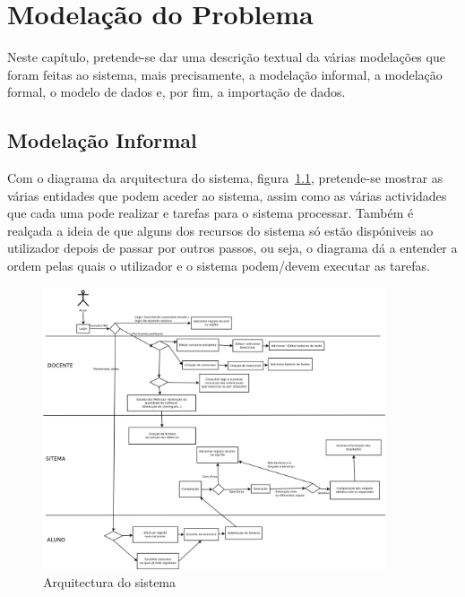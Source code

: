 \newcommand{\rarrow}{\rightarrow}
\newcommand{\larrow}{\leftarrow}
\newcommand{\unif}{\sim}
\def\prop#1#2#3{\noindent\\$\begin{array}{l} \{#1\} \\ #2 \\ \{#3\} \\ \end{array}$\\\\}

\chapter{Modelação do Problema} \label{chap modprob}
\minitoc

Neste capítulo, pretende-se dar uma descrição textual da várias modelações que foram feitas ao sistema, mais precisamente, a modelação informal, a modelação formal, o modelo de dados e, por fim, a importação de dados.

\section{Modelação Informal}\label{sec modinf}
Com o diagrama da arquitectura do sistema, figura~\ref{fig diaact}, pretende-se mostrar as várias entidades que podem aceder ao sistema, assim como as várias
actividades que cada uma pode realizar e tarefas para o sistema processar.
Também é realçada a ideia de que alguns dos recursos do sistema só estão dispóniveis ao utilizador depois 
de passar por outros passos, ou seja, o diagrama dá a entender a ordem pelas quais o utilizador e o sistema podem/devem executar as tarefas.\\

\begin{figure}[htbp]
\begin{center}
\includegraphics[width=0.9\textwidth]{Images/EL-PI}
\caption{Arquitectura do sistema}\label{fig diaact}
\end{center}
\end{figure}

